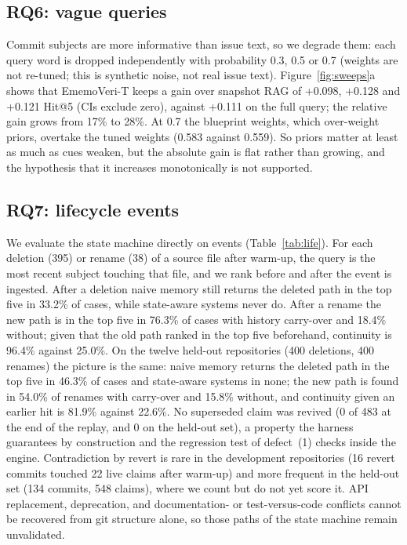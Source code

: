 \documentclass[runningheads]{llncs}
\newcommand{\sys}{EmemoVeri}
\begin{document}
\subsection{RQ6: vague queries}
\label{sec:degrade}
Commit subjects are more informative than issue text, so we degrade them: each query word is dropped independently with probability 0.3, 0.5 or 0.7 (weights are not re-tuned; this is synthetic noise, not real issue text). Figure~\ref{fig:sweeps}a shows that \sys{}-T keeps a gain over snapshot RAG of +0.098, +0.128 and +0.121 Hit@5 (CIs exclude zero), against +0.111 on the full query; the relative gain grows from 17\% to 28\%. At 0.7 the blueprint weights, which over-weight priors, overtake the tuned weights (0.583 against 0.559). So priors matter at least as much as cues weaken, but the absolute gain is flat rather than growing, and the hypothesis that it increases monotonically is not supported.

\subsection{RQ7: lifecycle events}
\label{sec:life}
We evaluate the state machine directly on events (Table~\ref{tab:life}). For each deletion (395) or rename (38) of a source file after warm-up, the query is the most recent subject touching that file, and we rank before and after the event is ingested. After a deletion naive memory still returns the deleted path in the top five in 33.2\% of cases, while state-aware systems never do. After a rename the new path is in the top five in 76.3\% of cases with history carry-over and 18.4\% without; given that the old path ranked in the top five beforehand, continuity is 96.4\% against 25.0\%. On the twelve held-out repositories (400 deletions, 400 renames) the picture is the same: naive memory returns the deleted path in the top five in 46.3\% of cases and state-aware systems in none; the new path is found in 54.0\% of renames with carry-over and 15.8\% without, and continuity given an earlier hit is 81.9\% against 22.6\%. No superseded claim was revived (0 of 483 at the end of the replay, and 0 on the held-out set), a property the harness guarantees by construction and the regression test of defect~(1) checks inside the engine. Contradiction by revert is rare in the development repositories (16 revert commits touched 22 live claims after warm-up) and more frequent in the held-out set (134 commits, 548 claims), where we count but do not yet score it. API replacement, deprecation, and documentation- or test-versus-code conflicts cannot be recovered from git structure alone, so those paths of the state machine remain unvalidated.
\end{document}
